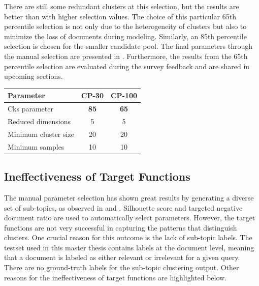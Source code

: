 There are still some redundant clusters at this selection, but the results are better than with higher selection values. The choice of this particular 65th percentile selection is not only due to the heterogeneity of clusters but also to minimize the loss of documents during modeling. Similarly, an 85th percentile selection is chosen for the smaller candidate pool. The final parameters through the manual selection are presented in . Furthermore, the results from the 65th percentile selection are evaluated during the survey feedback and are shared in upcoming sections.
 
 \begin{center}
 	\label{tab:manual_parameter_selection}
 	\begin{tabularx}{.5\textwidth}{|Y|c|c|}
 		\hline
 		Parameter & CP-30 & CP-100 \\
 		\hline
 		
 		Cks parameter & \textbf{85} &         \textbf{65} \\ \hline
 		Reduced dimensions &  5  &       5 \\ \hline
 		Minimum cluster size & 20 &         20 \\ \hline
 		Minimum samples &    10  &     10 \\ \hline
 		
 	\end{tabularx}
 	
 \end{center}
 
 \subsection{Ineffectiveness of Target Functions}
 
The manual parameter selection has shown great results by generating a diverse set of sub-topics, as observed in  and . Silhouette score and targeted negative document ratio are used to automatically select parameters. However, the target functions are not very successful in capturing the patterns that distinguish clusters. One crucial reason for this outcome is the lack of sub-topic labels. The testset used in this master thesis contains labels at the document level, meaning that a document is labeled as either relevant or irrelevant for a given query. There are no ground-truth labels for the sub-topic clustering output. Other reasons for the ineffectiveness of target functions are highlighted below.
 
